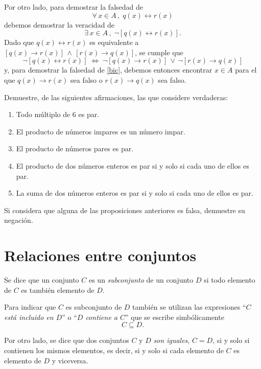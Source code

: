Por otro lado, para demostrar la falsedad de 
\begin{equation}\label{bic}
	\forall\, x \in A\, ,\; q(x)\leftrightarrow r(x)
\end{equation}
debemos demostrar la veracidad de
\[
	\exists\, x \in A\, ,\; 
\neg\left[q(x)\leftrightarrow r(x)\right].
\]
Dado que $q(x) \leftrightarrow r(x)$ es equivalente a 
$\left[q(x)\rightarrow r(x)\right]\,\wedge\,\left[r(x)\rightarrow q(x)\right]$,
se cumple que
\[
\neg \left[q(x) \leftrightarrow r(x)\right]
\;\Leftrightarrow\;
\neg\left[q(x)\rightarrow r(x)\right]\,\vee\,
\neg\left[r(x)\rightarrow q(x)\right]
\]
y, para demostrar la falsedad de \eqref{bic}, 
debemos entonces encontrar $x \in A$ para el que 
$q(x)\rightarrow r(x)$ sea falso o $r(x)\rightarrow q(x)$
sea falso.

\begin{ejercicio}
	Demuestre, de las siguientes afirmaciones, las que considere
	verdaderas:
	\begin{enumerate}
		\item Todo m\'ultiplo de 6 es par.
		
		\medskip 
		
		\item El producto de n\'umeros impares es un n\'umero impar.
		
		\medskip 
		
		\item El producto de n\'umeros pares es par.
		
		\medskip 
		
		\item El producto de dos n\'umeros enteros es par si y solo
			si cada uno de ellos es par.
		
		\medskip 
		
		\item La suma de dos n\'umeros enteros es par
			si y solo si cada uno de ellos es par.			
	\end{enumerate}
	
	Si considera que alguna de las proposiciones anteriores es
	falsa, demuestre su negaci\'on.
\end{ejercicio}


\section{Relaciones entre conjuntos}

\begin{defn}
	Se dice que un conjunto $C$ es un {\em subconjunto} 
	de un conjunto $D$ si todo elemento de $C$ 
	es también elemento de $D$.
	
	Para indicar que $C$ es subconjunto de $D$ tambi\'en
	se utilizan las expresiones 
	``{\em $C$ está incluido en $D$}'' 
	o ``{\em $D$ contiene a $C$}'' que
	se escribe simb\'olicamente $$C\subseteq D.$$
	
	Por otro lado, se dice que dos conjuntos $C$ y $D$ 
	{\em son iguales}, $C = D$, si y solo si contienen los mismos
	elementos, es decir, si y solo si cada elemento
	de $C$ es elemento de $D$ y viceversa.
\end{defn}

